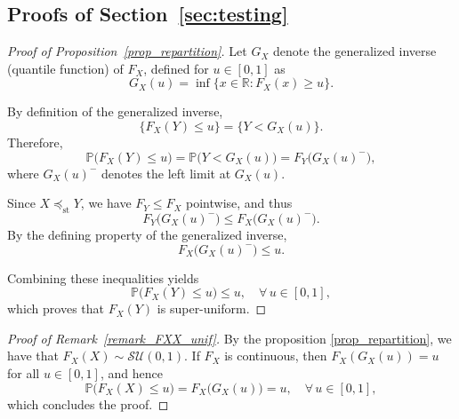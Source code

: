 \documentclass[a4paper,11pt]{article}
\theoremstyle{plain}
\newcommand{\1}{\mathbf{1}}
\begin{document}
\subsection{Proofs of Section~\ref{sec:testing}}\label{app:proofs_testing}
\begin{proof}[Proof of Proposition~\ref{prop_repartition}]

Let \(G_X\) denote the generalized inverse (quantile function) of \(F_X\),
defined for \(u\in[0,1]\) as
\begin{equation}
G_X(u) = \inf\{x\in\mathbb{R} : F_X(x) \ge u\}.
\end{equation}

By definition of the generalized inverse,
\begin{equation}
\{F_X(Y) \le u\} = \{Y < G_X(u)\}.
\end{equation}
Therefore,
\begin{equation}
\mathbb{P}\bigl(F_X(Y)\le u\bigr)
= \mathbb{P}\bigl(Y < G_X(u)\bigr)
= F_Y\bigl(G_X(u)^-\bigr),
\end{equation}
where \(G_X(u)^-\) denotes the left limit at \(G_X(u)\).

Since \(X \preceq_{\mathrm{st}} Y\), we have \(F_Y \le F_X\) pointwise, and thus
\begin{equation}
F_Y\bigl(G_X(u)^-\bigr)
\le F_X\bigl(G_X(u)^-\bigr).
\end{equation}
By the defining property of the generalized inverse,
\begin{equation}
F_X\bigl(G_X(u)^-\bigr) \le u.
\end{equation}

Combining these inequalities yields
\begin{equation}
\mathbb{P}\bigl(F_X(Y)\le u\bigr) \leq u,
\quad \forall\, u\in[0,1],
\end{equation}
which proves that \(F_X(Y)\) is super-uniform.


\end{proof}


\begin{proof}[Proof of Remark~\ref{remark_FXX_unif}]

  By the proposition \ref{prop_repartition}, we have that $F_X(X) \sim \mathcal{SU}(0,1)$. If \(F_X\) is continuous, then \(F_X(G_X(u)) = u\) for all \(u\in[0,1]\), and hence
  \begin{equation}
\mathbb{P}\bigl(F_X(X)\le u\bigr)
= F_X\bigl(G_X(u)\bigr)
= u,
\quad \forall\,u\in[0,1],
\end{equation}
which concludes the proof.

\end{proof}
\end{document}
